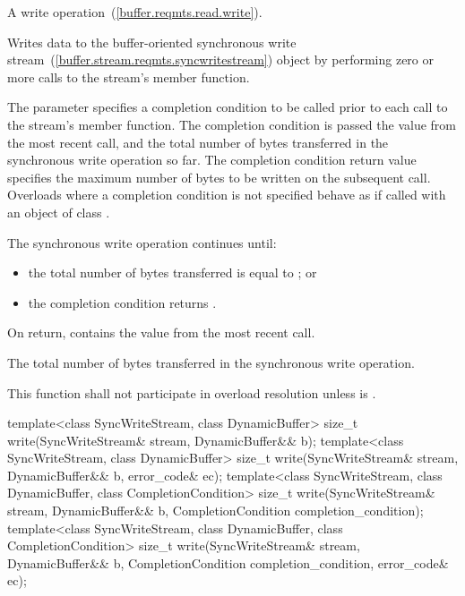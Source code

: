 \begin{itemdescr}
\pnum
A write operation~(\ref{buffer.reqmts.read.write}).

\pnum
\effects Writes data to the buffer-oriented synchronous write stream~(\ref{buffer.stream.reqmts.syncwritestream}) object  by performing zero or more calls to the stream's  member function.

\pnum
The  parameter specifies a completion condition to be called prior to each call to the stream's  member function. The completion condition is passed the  value from the most recent  call, and the total number of bytes transferred in the synchronous write operation so far. The completion condition return value specifies the maximum number of bytes to be written on the subsequent  call. Overloads where a completion condition is not specified behave as if called with an object of class .

\pnum
 The synchronous write operation continues until:

\begin{itemize}
\item
the total number of bytes transferred is equal to ; or
\item
the completion condition returns .
\end{itemize}

\pnum
On return,  contains the  value from the most recent  call.

\pnum
\returns The total number of bytes transferred in the synchronous write operation.

\pnum
\remarks This function shall not participate in overload resolution unless  is .
\end{itemdescr}

%
\begin{itemdecl}
template<class SyncWriteStream, class DynamicBuffer>
  size_t write(SyncWriteStream& stream, DynamicBuffer&& b);
template<class SyncWriteStream, class DynamicBuffer>
  size_t write(SyncWriteStream& stream, DynamicBuffer&& b, error_code& ec);
template<class SyncWriteStream, class DynamicBuffer, class CompletionCondition>
  size_t write(SyncWriteStream& stream, DynamicBuffer&& b,
               CompletionCondition completion_condition);
template<class SyncWriteStream, class DynamicBuffer, class CompletionCondition>
  size_t write(SyncWriteStream& stream, DynamicBuffer&& b,
               CompletionCondition completion_condition,
               error_code& ec);
\end{itemdecl}

